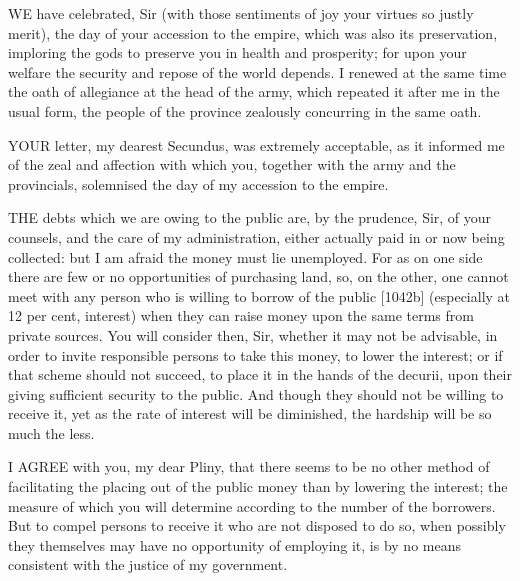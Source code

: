 
WE have celebrated, Sir (with those sentiments of joy your virtues so
justly merit), the day of your accession to the empire, which was also its
preservation, imploring the gods to preserve you in health and prosperity;
for upon your welfare the security and repose of the world depends. I
renewed at the same time the oath of allegiance at the head of the army,
which repeated it after me in the usual form, the people of the province
zealously concurring in the same oath.


YOUR letter, my dearest Secundus, was extremely acceptable, as it informed
me of the zeal and affection with which you, together with the army and
the provincials, solemnised the day of my accession to the empire.


THE debts which we are owing to the public are, by the prudence, Sir, of
your counsels, and the care of my administration, either actually paid in
or now being collected: but I am afraid the money must lie unemployed. For
as on one side there are few or no opportunities of purchasing land, so,
on the other, one cannot meet with any person who is willing to borrow of
the public [1042b] (especially at 12 per cent, interest)
when they can raise money upon the same terms from private sources. You
will consider then, Sir, whether it may not be advisable, in order to
invite responsible persons to take this money, to lower the interest; or
if that scheme should not succeed, to place it in the hands of the
decurii, upon their giving sufficient security to the public. And though
they should not be willing to receive it, yet as the rate of interest will
be diminished, the hardship will be so much the less.


I AGREE with you, my dear Pliny, that there seems to be no other method of
facilitating the placing out of the public money than by lowering the
interest; the measure of which you will determine according to the number
of the borrowers. But to compel persons to receive it who are not disposed
to do so, when possibly they themselves may have no opportunity of
employing it, is by no means consistent with the justice of my government.


